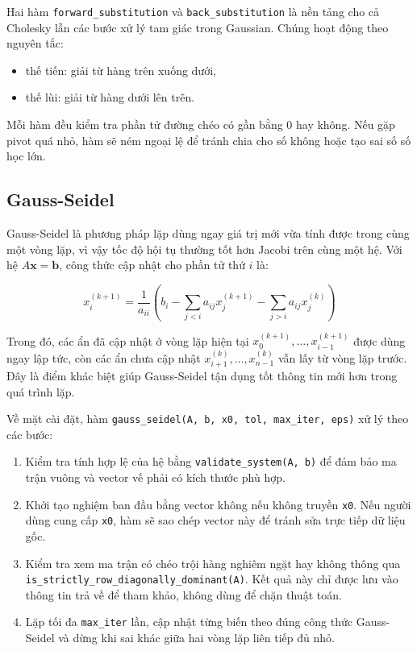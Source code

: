 \documentclass[12pt, a4paper, twoside]{article}
\begin{document}
Hai hàm \texttt{forward\_substitution} và \texttt{back\_substitution} là nền tảng cho cả Cholesky lẫn các bước xử lý tam giác trong Gaussian. Chúng hoạt động theo nguyên tắc:
\begin{itemize}
    \item thế tiến: giải từ hàng trên xuống dưới,
    \item thế lùi: giải từ hàng dưới lên trên.
\end{itemize}

Mỗi hàm đều kiểm tra phần tử đường chéo có gần bằng 0 hay không. Nếu gặp pivot quá nhỏ, hàm sẽ ném ngoại lệ để tránh chia cho số không hoặc tạo sai số số học lớn.

\subsection{Gauss-Seidel}

Gauss-Seidel là phương pháp lặp dùng ngay giá trị mới vừa tính được trong cùng một vòng lặp, vì vậy tốc độ hội tụ thường tốt hơn Jacobi trên cùng một hệ. Với hệ $A\mathbf{x}=\mathbf{b}$, công thức cập nhật cho phần tử thứ $i$ là:

\[
x_i^{(k+1)} = \frac{1}{a_{ii}}\left(b_i - \sum_{j < i} a_{ij}x_j^{(k+1)} - \sum_{j > i} a_{ij}x_j^{(k)}\right)
\]

Trong đó, các ẩn đã cập nhật ở vòng lặp hiện tại $x_0^{(k+1)},\dots,x_{i-1}^{(k+1)}$ được dùng ngay lập tức, còn các ẩn chưa cập nhật $x_{i+1}^{(k)},\dots,x_{n-1}^{(k)}$ vẫn lấy từ vòng lặp trước. Đây là điểm khác biệt giúp Gauss-Seidel tận dụng tốt thông tin mới hơn trong quá trình lặp.

Về mặt cài đặt, hàm \texttt{gauss\_seidel(A, b, x0, tol, max\_iter, eps)} xử lý theo các bước:
\begin{enumerate}
    \item Kiểm tra tính hợp lệ của hệ bằng \texttt{validate\_system(A, b)} để đảm bảo ma trận vuông và vector vế phải có kích thước phù hợp.
    \item Khởi tạo nghiệm ban đầu bằng vector không nếu không truyền \texttt{x0}. Nếu người dùng cung cấp \texttt{x0}, hàm sẽ sao chép vector này để tránh sửa trực tiếp dữ liệu gốc.
    \item Kiểm tra xem ma trận có chéo trội hàng nghiêm ngặt hay không thông qua \texttt{is\_strictly\_row\_diagonally\_dominant(A)}. Kết quả này chỉ được lưu vào thông tin trả về để tham khảo, không dùng để chặn thuật toán.
    \item Lặp tối đa \texttt{max\_iter} lần, cập nhật từng biến theo đúng công thức Gauss-Seidel và dừng khi sai khác giữa hai vòng lặp liên tiếp đủ nhỏ.
\end{enumerate}
\end{document}
